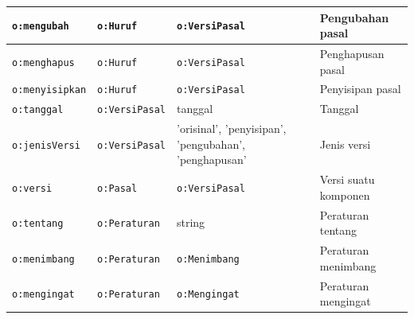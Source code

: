 \begin{longtable}{|p{}|p{}|p{}|p{}|}
  \texttt{o:mengubah}        & \texttt{o:Huruf}                                                                                                                 & \texttt{o:VersiPasal}                                 & Pengubahan pasal                                  \\ \hline
  \texttt{o:menghapus}       & \texttt{o:Huruf}                                                                                                                 & \texttt{o:VersiPasal}                                 & Penghapusan pasal                                 \\ \hline
  \texttt{o:menyisipkan}     & \texttt{o:Huruf}                                                                                                                 & \texttt{o:VersiPasal}                                 & Penyisipan pasal                                  \\ \hline
  \texttt{o:tanggal}         & \texttt{o:VersiPasal}                                                                                                            & tanggal                                               & Tanggal                                           \\ \hline
  \texttt{o:jenisVersi}      & \texttt{o:VersiPasal}                                                                                                            & 'orisinal', 'penyisipan', 'pengubahan', 'penghapusan' & Jenis versi                                       \\ \hline
  \texttt{o:versi}           & \texttt{o:Pasal}                                                                                                                 & \texttt{o:VersiPasal}                                 & Versi suatu komponen                              \\ \hline
  \texttt{o:tentang}         & \texttt{o:Peraturan}                                                                                                             & string                                                & Peraturan tentang                                 \\ \hline
  \texttt{o:menimbang}       & \texttt{o:Peraturan}                                                                                                             & \texttt{o:Menimbang}                                  & Peraturan menimbang                               \\ \hline
  \texttt{o:mengingat}       & \texttt{o:Peraturan}                                                                                                             & \texttt{o:Mengingat}                                  & Peraturan mengingat                               \\ \hline

\end{longtable}
